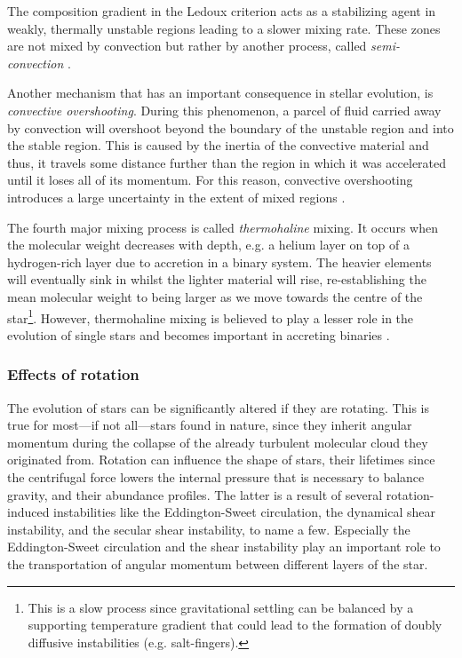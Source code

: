 \documentclass[../../main/thesis_msc.tex]{subfiles}
\begin{document}
						The composition gradient in the Ledoux criterion acts as a stabilizing agent in weakly, thermally unstable regions leading to a slower mixing rate. These zones are not mixed by convection but rather by another process, called \emph{semi-convection} \citep[see also Section\,\ref{sec2:thermo_and_semi}, and ][]{Spruit2013, Langer1983, Langer1991}.
						
						Another mechanism that has an important consequence in stellar evolution, is \emph{convective overshooting}. During this phenomenon, a parcel of fluid carried away by convection will overshoot beyond the boundary of the unstable region and into the stable region. This is caused by the inertia of the convective material and thus, it travels some distance further than the region in which it was accelerated until it loses all of its momentum. For this reason, convective overshooting introduces a large uncertainty in the extent of mixed regions \citep[see][for a detailed discussion on the effects of overshooting]{Saslaw1965, Stothers1990, Roxburgh1998}.
						
						The fourth major mixing process is called \emph{thermohaline} mixing. It occurs when the molecular weight decreases with depth, e.g. a helium layer on top of a hydrogen-rich layer due to accretion in a binary system. The heavier elements will eventually sink in whilst the lighter material will rise, re-establishing the mean molecular weight to being larger as we move towards the centre of the star\footnote{This is a slow process since gravitational settling can be balanced by a supporting temperature gradient that could lead to the formation of doubly diffusive instabilities (e.g. salt-fingers).}. However, thermohaline mixing is believed to play a lesser role in the evolution of single stars and becomes important in accreting binaries \citep[see also][]{Cantiello, Charbonnel}.
		
						
						
						
						
					\subsubsection{Effects of rotation}
					
						The evolution of stars can be significantly altered if they are rotating. This is true for most---if not all---stars found in nature, since they inherit angular momentum during the collapse of the already turbulent molecular cloud they originated from. Rotation can influence the shape of stars, their lifetimes since the centrifugal force lowers the internal pressure that is necessary to balance gravity, and their abundance profiles. The latter is a result of several rotation-induced instabilities like the Eddington-Sweet circulation, the dynamical shear instability, and the secular shear instability, to name a few. Especially the Eddington-Sweet circulation and the shear instability play an important role to the transportation of angular momentum between different layers of the star. 
						
\end{document}
